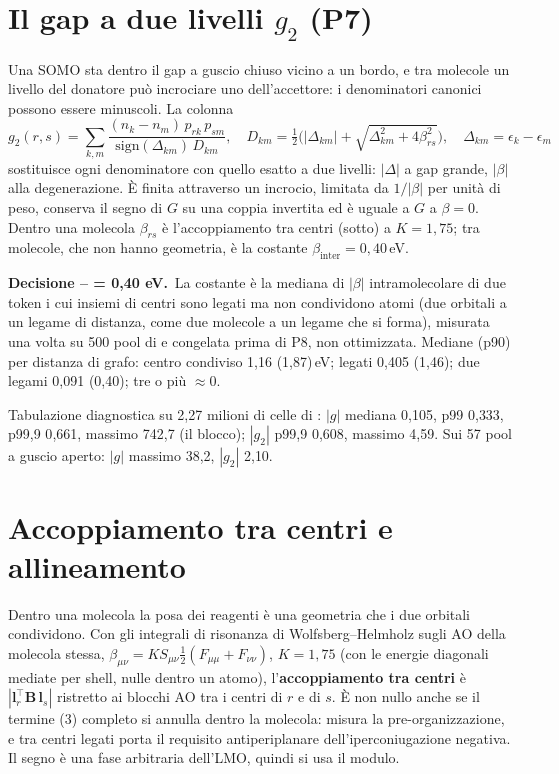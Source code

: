 \documentclass[11pt,a4paper]{report}
\newcommand{\code}[1]{\texttt{\detokenize{#1}}}
\newcommand{\vb}[1]{\bm{#1}}
\newcommand{\decisione}[2]{%
  \par\medskip\noindent\colorbox{ksfondo}{\parbox{\dimexpr\linewidth-2\fboxsep\relax}{%
  \small\textbf{\color{ksblu}Decisione -- #1.}\ #2}}\par\medskip}
\begin{document}
\section{Il gap a due livelli $g_2$ (P7)}
Una SOMO sta dentro il gap a guscio chiuso vicino a un bordo, e tra molecole un livello del donatore
può incrociare uno dell'accettore: i denominatori canonici possono essere minuscoli. La colonna
\begin{equation}
g_2(r,s)=\sum_{k,m}\frac{(n_k-n_m)\,p_{rk}\,p_{sm}}{\mathrm{sign}(\Delta_{km})\,D_{km}},\quad
D_{km}=\tfrac12\Big(|\Delta_{km}|+\sqrt{\Delta_{km}^2+4\beta_{rs}^2}\Big),\quad\Delta_{km}=\epsilon_k-\epsilon_m
\end{equation}
sostituisce ogni denominatore con quello esatto a due livelli: $|\Delta|$ a gap grande, $|\beta|$ alla
degenerazione. È finita attraverso un incrocio, limitata da $1/|\beta|$ per unità di peso, conserva il
segno di $G$ su una coppia invertita ed è uguale a $G$ a $\beta=0$. Dentro una molecola $\beta_{rs}$ è
l'accoppiamento tra centri (sotto) a $K=1{,}75$; tra molecole, che non hanno geometria, è la costante
$\beta_{\mathrm{inter}}=0{,}40$\,eV.

\decisione{\code{BETA_INTER} = 0{,}40 eV}{La costante è la mediana di $|\beta|$ intramolecolare di due
token i cui insiemi di centri sono legati ma non condividono atomi (due orbitali a un legame di
distanza, come due molecole a un legame che si forma), misurata una volta su 500 pool di
\code{closed_base} e congelata prima di P8, non ottimizzata. Mediane (p90) per distanza di grafo:
centro condiviso 1{,}16 (1{,}87)\,eV; legati 0{,}405 (1{,}46); due legami 0{,}091 (0{,}40); tre o più
$\approx0$.}

Tabulazione diagnostica su 2{,}27 milioni di celle di \code{closed_base}: $|g|$ mediana 0{,}105, p99
0{,}333, p99{,}9 0{,}661, massimo 742{,}7 (il blocco); $|g_2|$ p99{,}9 0{,}608, massimo 4{,}59. Sui 57
pool a guscio aperto: $|g|$ massimo 38{,}2, $|g_2|$ 2{,}10.

\section{Accoppiamento tra centri e allineamento}
Dentro una molecola la posa dei reagenti è una geometria che i due orbitali condividono. Con gli
integrali di risonanza di Wolfsberg--Helmholz sugli AO della molecola stessa,
$\beta_{\mu\nu}=K S_{\mu\nu}\tfrac12(F_{\mu\mu}+F_{\nu\nu})$, $K=1{,}75$ (con le energie diagonali
mediate per shell, nulle dentro un atomo), l'\textbf{accoppiamento tra centri} è
$|\vb{l}_r^{\!\top}\vb{B}\,\vb{l}_s|$ ristretto ai blocchi AO tra i centri di $r$ e di $s$. È non nullo
anche se il termine (3) completo si annulla dentro la molecola: misura la pre-organizzazione, e tra
centri legati porta il requisito antiperiplanare dell'iperconiugazione negativa. Il segno è una fase
arbitraria dell'LMO, quindi si usa il modulo.
\end{document}
